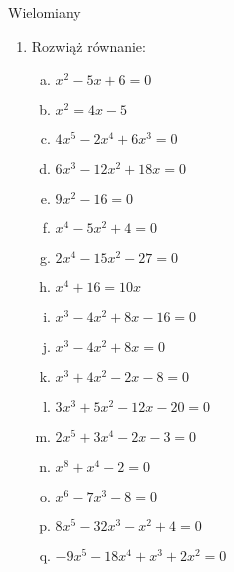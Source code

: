 \documentclass[12pt,a4paper]{article}
\begin{document}
	\begin{center}
		\LARGE Wielomiany
	\end{center}
	\vspace{1cm}
	
	
	\begin{enumerate}[1.]	
		\Large
		\item Rozwiąż równanie:
		
		\begin{enumerate}[a)]
			\item $x^2 - 5x + 6 = 0$
			\item $x^2 = 4x - 5 $
			\item $4x^5 - 2x^4 + 6x^3=0$
			\item $6x^3 -12x^2+18x=0 $
			\item $9x^2-16=0 $
			\item $x^4-5x^2+4=0 $
			\item $2x^4-15x^2-27=0 $
			\item $x^4+16=10x $
			\item $x^3-4x^2+8x-16=0 $
			\item $x^3-4x^2+8x=0 $
			\item $x^3+4x^2-2x-8=0 $
			\item $3x^3+5x^2-12x-20=0 $
			\item $2x^5+3x^4-2x-3=0 $
			\item $x^8+x^4-2=0 $
			\item $x^6-7x^3-8=0 $
			\item $8x^5-32x^3-x^2+4=0 $
			\item $-9x^5-18x^4+x^3+2x^2=0 $
		\end{enumerate}
		
	\end{enumerate}
\end{document}
